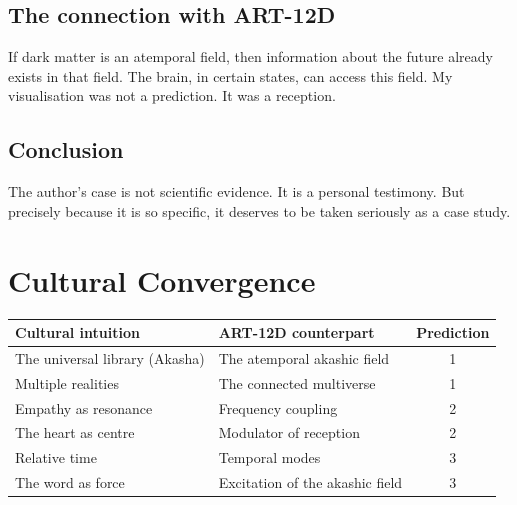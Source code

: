 \subsection{The connection with ART-12D}
If dark matter is an atemporal field, then information about the future already exists in that field. The brain, in certain states, can access this field. My visualisation was not a prediction. It was a reception.

\subsection{Conclusion}
The author's case is not scientific evidence. It is a personal testimony. But precisely because it is so specific, it deserves to be taken seriously as a case study.

\section{Cultural Convergence}
\begin{table}[H]
\centering
\begin{tabular}{@{}llc@{}}
\toprule
\textbf{Cultural intuition} & \textbf{ART-12D counterpart} & \textbf{Prediction} \\ \midrule
The universal library (Akasha) & The atemporal akashic field & 1 \\
Multiple realities & The connected multiverse & 1 \\
Empathy as resonance & Frequency coupling & 2 \\
The heart as centre & Modulator of reception & 2 \\
Relative time & Temporal modes & 3 \\
The word as force & Excitation of the akashic field & 3 \\ \bottomrule
\end{tabular}
\end{table}

\newpage
